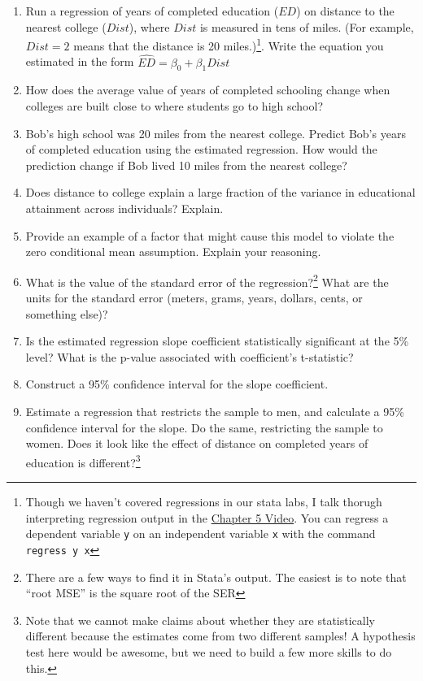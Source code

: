 \documentclass[11pt]{article}
\begin{document}
\begin{enumerate}
\begin{enumerate}
\def\labelenumi{\alph{enumi}.}
\item
  Run a regression of years of completed education (\(ED\)) on distance
  to the nearest college (\(Dist\)), where \(Dist\) is measured in tens
  of miles. (For example, \(Dist=2\) means that the distance is 20
  miles.)\footnote{Though we haven't covered regressions in our stata
    labs, I talk thorugh interpreting regression output in the
    \href{https://youtu.be/DZo5m5q3bmA}{Chapter 5 Video}. You can
    regress a dependent variable \texttt{y} on an independent variable
    \texttt{x} with the command \texttt{regress\ y\ x}}. Write the
  equation you estimated in the form
  \(\widehat{ED} = \beta_0 + \beta_1 Dist\)
\item
  How does the average value of years of completed schooling change when
  colleges are built close to where students go to high school?
\item
  Bob's high school was 20 miles from the nearest college. Predict Bob's
  years of completed education using the estimated regression. How would
  the prediction change if Bob lived 10 miles from the nearest college?
\item
  Does distance to college explain a large fraction of the variance in
  educational attainment across individuals? Explain.
\item
  Provide an example of a factor that might cause this model to violate
  the zero conditional mean assumption. Explain your reasoning.
\item
  What is the value of the standard error of the regression?\footnote{There
    are a few ways to find it in Stata's output. The easiest is to note
    that ``root MSE'' is the square root of the SER} What are the units
  for the standard error (meters, grams, years, dollars, cents, or
  something else)?
\item
  Is the estimated regression slope coefficient statistically
  significant at the 5\% level? What is the p-value associated with
  coefficient's t-statistic?
\item
  Construct a 95\% confidence interval for the slope coefficient.
\item
  Estimate a regression that restricts the sample to men, and calculate
  a 95\% confidence interval for the slope. Do the same, restricting the
  sample to women. Does it look like the effect of distance on completed
  years of education is different?\footnote{Note that we cannot make
    claims about whether they are statistically different because the
    estimates come from two different samples! A hypothesis test here
    would be awesome, but we need to build a few more skills to do this.}
\end{enumerate}
\end{enumerate}
\end{document}

